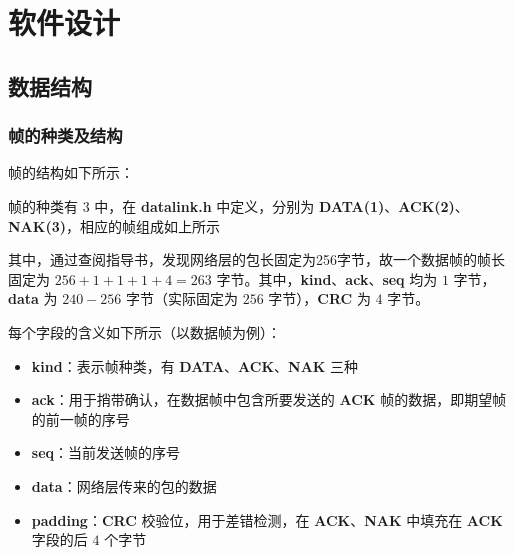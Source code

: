 \section{软件设计}
    \subsection{数据结构}
        \subsubsection{帧的种类及结构}
            \par 帧的结构如下所示：
            
            \par 帧的种类有 $3$ 中，在 \textbf{datalink.h} 中定义，分别为 \textbf{DATA(1)}、\textbf{ACK(2)}、 \textbf{NAK(3)}，相应的帧组成如上所示
            \par 其中，通过查阅指导书，发现网络层的包长固定为256字节，故一个数据帧的帧长固定为 $256 + 1 + 1 + 1 + 4 = 263$ 字节。其中，\textbf{kind}、\textbf{ack}、\textbf{seq} 均为 $1$ 字节，\textbf{data} 为 $240-256$ 字节（实际固定为 $256$ 字节），\textbf{CRC} 为 $4$ 字节。
            \par 每个字段的含义如下所示（以数据帧为例）：
            \begin{itemize}
                \item \textbf{kind}：表示帧种类，有 \textbf{DATA}、\textbf{ACK}、\textbf{NAK} 三种
                \item \textbf{ack}：用于捎带确认，在数据帧中包含所要发送的 \textbf{ACK} 帧的数据，即期望帧的前一帧的序号
                \item \textbf{seq}：当前发送帧的序号
                \item \textbf{data}：网络层传来的包的数据
                \item \textbf{padding}：\textbf{CRC} 校验位，用于差错检测，在 \textbf{ACK}、\textbf{NAK} 中填充在 \textbf{ACK} 字段的后 $4$ 个字节 
            \end{itemize} 
        
